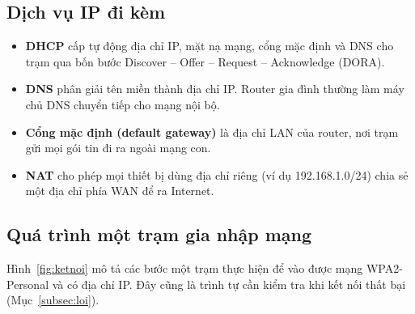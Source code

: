 \documentclass[12pt,a4paper]{article}
\numberwithin{figure}{section}
\numberwithin{table}{section}
\begin{document}
\subsection{Dịch vụ IP đi kèm}
\label{subsec:dichvu}
\begin{itemize}
  \item \textbf{DHCP} cấp tự động địa chỉ IP, mặt nạ mạng, cổng mặc định và DNS
    cho trạm qua bốn bước Discover -- Offer -- Request -- Acknowledge (DORA).
  \item \textbf{DNS} phân giải tên miền thành địa chỉ IP. Router gia đình
    thường làm máy chủ DNS chuyển tiếp cho mạng nội bộ.
  \item \textbf{Cổng mặc định (default gateway)} là địa chỉ LAN của router,
    nơi trạm gửi mọi gói tin đi ra ngoài mạng con.
  \item \textbf{NAT} cho phép mọi thiết bị dùng địa chỉ riêng (ví dụ
    192.168.1.0/24) chia sẻ một địa chỉ phía WAN để ra Internet.
\end{itemize}

\subsection{Quá trình một trạm gia nhập mạng}
Hình~\ref{fig:ketnoi} mô tả các bước một trạm thực hiện để vào được mạng
WPA2-Personal và có địa chỉ IP. Đây cũng là trình tự cần kiểm tra khi kết nối
thất bại (Mục~\ref{subsec:loi}).
\end{document}
